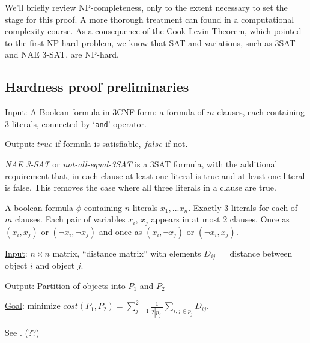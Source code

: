 We'll briefly review NP-completeness, only to the extent necessary to
set the stage for this proof.  A more thorough treatment can found in
a computational complexity course. As a consequence of the Cook-Levin
Theorem, which pointed to the first NP-hard problem, we know that SAT
and variations, such as 3SAT and NAE 3-SAT, are NP-hard.

\subsection{Hardness proof preliminaries}
\begin{definition}[3SAT]
\item \underline{Input}:  A Boolean formula in 3CNF-form: a formula of
  $m$ clauses, each containing 3 literals, connected by `\texttt{and}'
  operator.
\item \underline{Output}:  $\textit{true}$ if formula is satisfiable,
  $\textit{false}$ if not.
\end{definition}

\begin{definition} \emph{NAE 3-SAT} or
  \emph{not-all-equal-3SAT} is a 3SAT formula, with the additional
  requirement that, in each clause at least one literal is true and at
  least one literal is false.  This removes the case where all three
  literals in a clause are true.   
\end{definition}

\begin{definition} 
A boolean formula $\phi$ containing $n$ literals $x_1,...x_n$.
Exactly 3 literals for each of $m$ clauses.  Each pair of variables
$x_i$, $x_j$ appears in at most 2 clauses.  Once as $(x_i,x_j)$ or
$(\neg x_i, \neg x_j)$ and once as  $(x_i,\neg x_j)$ or $(\neg x_i,
x_j)$. 
\end{definition}

\begin{definition}
\item \underline{Input}:  $n \times n$ matrix, ``distance matrix''
  with elements $D_{ij} = $ distance between object $i$ and object
  $j$.
\item \underline{Output}:  Partition of objects into $P_1$ and $P_2$
\item \underline{Goal}: minimize $cost(P_1,P_2) = \sum_{j=1}^{2}
  \frac{1}{2|p_j|} \sum_{i,j \in p_j} D_{ij}$. 
\end{definition}


\begin{lemma} \label{np-nae-3-sat}
See \cite{das2008}. (??)
\end{lemma}

